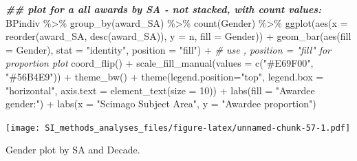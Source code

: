 \documentclass[
]{article}
\newenvironment{Shaded}{\begin{snugshade}}{\end{snugshade}}
\newcommand{\AttributeTok}[1]{\textcolor[rgb]{0.77,0.63,0.00}{#1}}
\newcommand{\CommentTok}[1]{\textcolor[rgb]{0.56,0.35,0.01}{\textit{#1}}}
\newcommand{\DecValTok}[1]{\textcolor[rgb]{0.00,0.00,0.81}{#1}}
\newcommand{\DocumentationTok}[1]{\textcolor[rgb]{0.56,0.35,0.01}{\textbf{\textit{#1}}}}
\newcommand{\FunctionTok}[1]{\textcolor[rgb]{0.00,0.00,0.00}{#1}}
\newcommand{\NormalTok}[1]{#1}
\newcommand{\SpecialCharTok}[1]{\textcolor[rgb]{0.00,0.00,0.00}{#1}}
\newcommand{\StringTok}[1]{\textcolor[rgb]{0.31,0.60,0.02}{#1}}
\begin{document}
\begin{Shaded}
\begin{Highlighting}[]
\DocumentationTok{\#\# plot for a all awards by SA {-} not stacked, with count values:}
\NormalTok{BPindiv }\SpecialCharTok{\%\textgreater{}\%} 
  \FunctionTok{group\_by}\NormalTok{(award\_SA) }\SpecialCharTok{\%\textgreater{}\%}
  \FunctionTok{count}\NormalTok{(Gender) }\SpecialCharTok{\%\textgreater{}\%}
  \FunctionTok{ggplot}\NormalTok{(}\FunctionTok{aes}\NormalTok{(}\AttributeTok{x =} \FunctionTok{reorder}\NormalTok{(award\_SA, }\FunctionTok{desc}\NormalTok{(award\_SA)), }\AttributeTok{y =}\NormalTok{ n, }\AttributeTok{fill =}\NormalTok{ Gender)) }\SpecialCharTok{+}
  \FunctionTok{geom\_bar}\NormalTok{(}\FunctionTok{aes}\NormalTok{(}\AttributeTok{fill =}\NormalTok{ Gender), }\AttributeTok{stat =} \StringTok{"identity"}\NormalTok{, }\AttributeTok{position =} \StringTok{"fill"}\NormalTok{) }\SpecialCharTok{+} \CommentTok{\# use , position = "fill" for proportion plot}
  \FunctionTok{coord\_flip}\NormalTok{() }\SpecialCharTok{+} 
  \FunctionTok{scale\_fill\_manual}\NormalTok{(}\AttributeTok{values =} \FunctionTok{c}\NormalTok{(}\StringTok{"\#E69F00"}\NormalTok{, }\StringTok{"\#56B4E9"}\NormalTok{)) }\SpecialCharTok{+}
  \FunctionTok{theme\_bw}\NormalTok{() }\SpecialCharTok{+}
  \FunctionTok{theme}\NormalTok{(}\AttributeTok{legend.position=}\StringTok{"top"}\NormalTok{, }\AttributeTok{legend.box =} \StringTok{"horizontal"}\NormalTok{, }\AttributeTok{axis.text =} \FunctionTok{element\_text}\NormalTok{(}\AttributeTok{size =} \DecValTok{10}\NormalTok{)) }\SpecialCharTok{+}
  \FunctionTok{labs}\NormalTok{(}\AttributeTok{fill =} \StringTok{"Awardee gender:"}\NormalTok{) }\SpecialCharTok{+}
  \FunctionTok{labs}\NormalTok{(}\AttributeTok{x =} \StringTok{"Scimago Subject Area"}\NormalTok{, }\AttributeTok{y =} \StringTok{"Awardee proportion"}\NormalTok{)  }
\end{Highlighting}
\end{Shaded}

\texttt{[image: SI\_methods\_analyses\_files/figure-latex/unnamed-chunk-57-1.pdf]}

Gender plot by SA and Decade.
\end{document}
